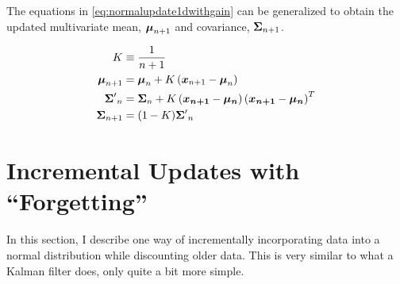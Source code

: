 \documentclass[../../main.tex]{subfiles}
\begin{document}
The equations in \eqref{eq:normalupdate1dwithgain} can be generalized to
obtain the updated multivariate mean, $\boldsymbol{\mu}_{n+1}$ and covariance,
$\boldsymbol{\Sigma}_{n+1}$.

\begin{align}
    \label{eq:normalupdatemulti}
    K &\equiv \frac{1}{n + 1}\\
    \boldsymbol{\mu}_{n+1} &= \boldsymbol{\mu}_{n} +
                          K \left(
                              \boldsymbol{x}_{n+1} - \boldsymbol{\mu}_{n}
                          \right) \nonumber\nonumber\\
    {\boldsymbol{\Sigma}'}_{n} &= \boldsymbol{\Sigma}_{n}
                          + K\left( \boldsymbol{x_{n+1}} - \boldsymbol{\mu_n}  \right)
                          \left( \boldsymbol{x_{n+1}} - \boldsymbol{\mu_n} \right)^T\nonumber\\
    {\boldsymbol{\Sigma}}_{n+1} &= (1 - K) {\boldsymbol{\Sigma}'}_{n}\nonumber
\end{align}

\section{Incremental Updates with ``Forgetting''}
In this section, I describe one way of incrementally incorporating data into a
normal distribution while discounting older data.  This is very similar to what
a Kalman filter does, only quite a bit more simple.
\end{document}
